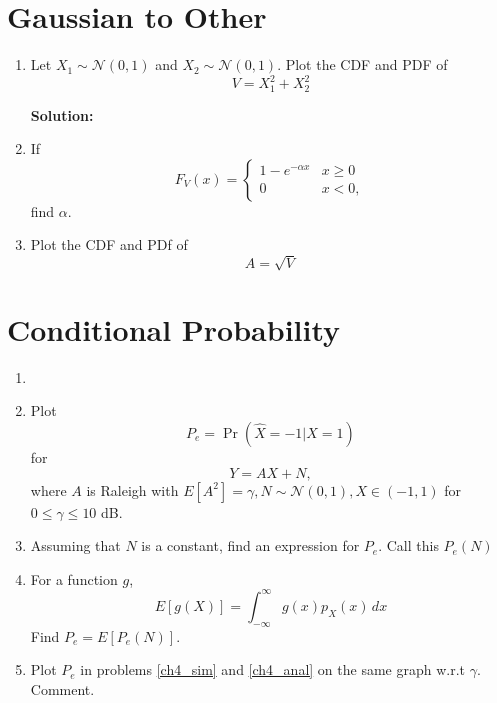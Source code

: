 \documentclass[journal,12pt,twocolumn]{IEEEtran}
\renewcommand\thesection{\arabic{section}}
\providecommand{\pr}[1]{\ensuremath{\Pr\left(#1\right)}}
\providecommand{\sbrak}[1]{\ensuremath{{}\left[#1\right]}}
\providecommand{\brak}[1]{\ensuremath{\left(#1\right)}}
\theoremstyle{remark}
\providecommand{\gauss}[2]{\mathcal{N}\ensuremath{\left(#1,#2\right)}}
\newcommand{\solution}{\noindent \textbf{Solution: }}
\numberwithin{equation}{section}
\begin{document}
\section{Gaussian to Other}
\begin{enumerate}[label=\thesection.\arabic*
,ref=\thesection.\theenumi]
\item
Let $X_1 \sim  \gauss{0}{1}$ and $X_2 \sim  \gauss{0}{1}$. Plot the CDF and PDF of
%
\begin{equation}
V = X_1^2 + X_2^2
\end{equation}

\solution 
%
%
\item
If
%
\begin{equation}
F_{V}(x) = 
\begin{cases}
1 - e^{-\alpha x} & x \geq 0 \\
0 & x < 0,
\end{cases}
\end{equation}
%
find $\alpha$.
%
\item
\label{ch3_raleigh_sim}
Plot the CDF and PDf of
%
\begin{equation}
A = \sqrt{V}
\end{equation}
%
\end{enumerate}
\section{Conditional Probability}
\begin{enumerate}[label=\thesection.\arabic*
,ref=\thesection.\theenumi]
\item
\item
\label{ch4_sim}
Plot 
\begin{equation}
P_e = \pr{\hat{X} = -1|X=1}
\end{equation}
%
for 
\begin{equation}
Y = AX+N,
\end{equation}
where $A$ is Raleigh with $E\sbrak{A^2} = \gamma, N \sim \gauss{0}{1}, X \in \brak{-1,1}$ for $0 \le \gamma \le 10$ dB.
%
\item
Assuming that $N$ is a constant, find an expression for $P_e$.  Call this $P_e(N)$
%
\item
%
\label{ch4_anal}
For a function $g$,
\begin{equation}
E\sbrak{g(X)} = \int_{-\infty}^{\infty}g(x)p_{X}(x)\, dx
\end{equation}
%
Find $P_e = E\sbrak{P_e(N)}$.
%
\item
Plot $P_e$ in problems \ref{ch4_sim} and \ref{ch4_anal} on the same graph w.r.t $\gamma$.  Comment.
		\end{enumerate}
\end{document}
